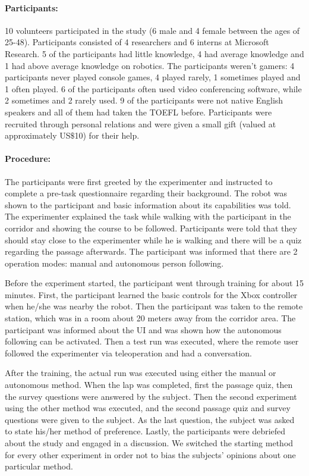 \paragraph{Participants:}

10 volunteers participated in the study (6 male and 4 female between the ages of 25-48). Participants consisted of 4 researchers and 6 interns at Microsoft Research. 5 of the participants had little knowledge, 4 had average knowledge and 1 had above average knowledge on robotics. The participants weren't gamers: 4 participants never played console games, 4 played rarely, 1 sometimes played and 1 often played. 6 of the participants often used video conferencing software, while 2 sometimes and 2 rarely used. 9 of the participants were not native English speakers and all of them had taken the TOEFL before. Participants were recruited through personal relations and were given a small gift (valued at approximately US$ \$ $10) for their help.

\paragraph{Procedure:}

The participants were first greeted by the experimenter and instructed to complete a pre-task questionnaire regarding their background. The robot was shown to the participant and basic information about its capabilities was told. The experimenter explained the task while walking with the participant in the corridor and showing the course to be followed. Participants were told that they should stay close to the experimenter while he is walking and there will be a quiz regarding the passage afterwards. The participant was informed that there are 2 operation modes: manual and autonomous person following.

Before the experiment started, the participant went through training for about 15 minutes. First, the participant learned the basic controls for the Xbox controller when he/she was nearby the robot. Then the participant was taken to the remote station, which was in a room about 20 meters away from the corridor area. The participant was informed about the UI and was shown how the autonomous following can be activated. Then a test run was executed, where the remote user followed the experimenter via teleoperation and had a conversation.

After the training, the actual run was executed using either the manual or autonomous method. When the lap was completed, first the passage quiz, then the survey questions were answered by the subject. Then the second experiment using the other method was executed, and the second passage quiz and survey questions were given to the subject. As the last question, the subject was asked to state his/her method of preference. Lastly, the participants were debriefed about the study and engaged in a discussion. We switched the starting method for every other experiment in order not to bias the subjects' opinions about one particular method.

